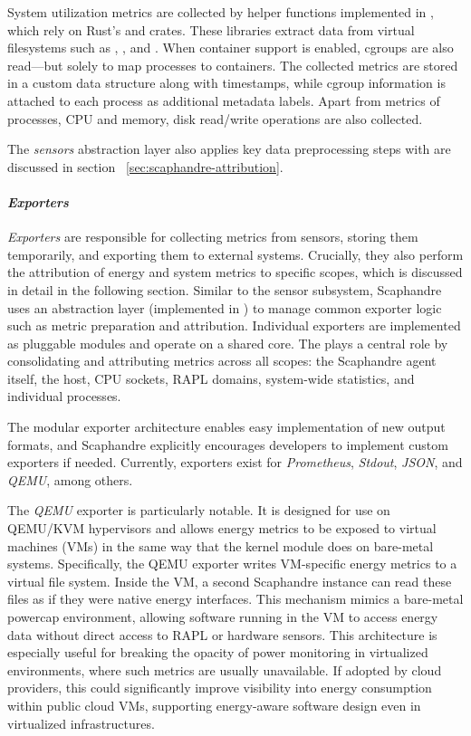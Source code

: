System utilization metrics are collected by helper functions implemented in , which rely on Rust’s  and  crates. These libraries extract data from virtual filesystems such as , , and . When container support is enabled, cgroups are also read—but solely to map processes to containers. The collected metrics are stored in a custom data structure along with timestamps, while cgroup information is attached to each process as additional metadata labels. Apart from metrics of processes, CPU and memory, disk read/write operations are also collected.

The \textit{sensors} abstraction layer also applies key data preprocessing steps with are discussed in section ~\ref{sec:scaphandre-attribution}.

\paragraph{\textit{Exporters}}
\textit{Exporters} are responsible for collecting metrics from sensors, storing them temporarily, and exporting them to external systems. Crucially, they also perform the attribution of energy and system metrics to specific scopes, which is discussed in detail in the following section. Similar to the sensor subsystem, Scaphandre uses an abstraction layer (implemented in ) to manage common exporter logic such as metric preparation and attribution. Individual exporters are implemented as pluggable modules and operate on a shared core. The  plays a central role by consolidating and attributing metrics across all scopes: the Scaphandre agent itself, the host, CPU sockets, RAPL domains, system-wide statistics, and individual processes.

The modular exporter architecture enables easy implementation of new output formats, and Scaphandre explicitly encourages developers to implement custom exporters if needed. Currently, exporters exist for \textit{Prometheus}, \textit{Stdout}, \textit{JSON}, and \textit{QEMU}, among others.

The \textit{QEMU} exporter is particularly notable. It is designed for use on QEMU/KVM hypervisors and allows energy metrics to be exposed to virtual machines (VMs) in the same way that the  kernel module does on bare-metal systems. Specifically, the QEMU exporter writes VM-specific energy metrics to a virtual file system. Inside the VM, a second Scaphandre instance can read these files as if they were native energy interfaces. This mechanism mimics a bare-metal powercap environment, allowing software running in the VM to access energy data without direct access to RAPL or hardware sensors. This architecture is especially useful for breaking the opacity of power monitoring in virtualized environments, where such metrics are usually unavailable. If adopted by cloud providers, this could significantly improve visibility into energy consumption within public cloud VMs, supporting energy-aware software design even in virtualized infrastructures.

